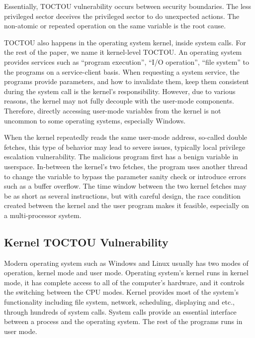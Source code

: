 Essentially, TOCTOU vulnerability occurs between security boundaries. The less privileged sector deceives the privileged sector to do unexpected actions. The non-atomic or repeated operation on the same variable is the root cause.

TOCTOU also happens in the operating system kernel, inside system calls. For the rest of the paper, we name it kernel-level TOCTOU. An operating system provides services such as ``program execution'', ``I/O operation'', ``file system'' to the programs on a service-client basis. When requesting a system service, the programs provide parameters, and how to invalidate them, keep them consistent during the system call is the kernel's responsibility. However, due to various reasons, the kernel may not fully decouple with the user-mode components. Therefore, directly accessing user-mode variables from the kernel is not uncommon to some operating systems, especially Windows.

When the kernel repeatedly reads the same user-mode address, so-called double fetches, this type of behavior may lead to severe issues, typically local privilege escalation vulnerability. The malicious program first has a benign variable in userspace. In-between the kernel's two fetches, the program uses another thread to change the variable to bypass the parameter sanity check or introduce errors such as a buffer overflow. The time window between the two kernel fetches may be as short as several instructions,  but with careful design, the race condition created between the kernel and the user program makes it feasible, especially on a multi-processor system.


\subsection{Kernel TOCTOU Vulnerability}

Modern operating system such as Windows and Linux usually has two modes of operation, kernel mode and user mode. Operating system's kernel runs in kernel mode, it has complete access to all of the computer's hardware, and it controls the switching between the CPU modes. Kernel provides most of the system's functionality including file system, network, scheduling, displaying and etc., through hundreds of system calls. System calls provide an essential interface between a process and the operating system. The rest of the programs runs in user mode. 

